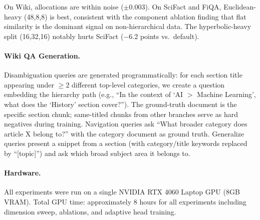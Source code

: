 \documentclass{article}
\begin{document}
On Wiki, allocations are within noise ($\pm$0.003). On SciFact and FiQA, Euclidean-heavy (48,8,8) is best, consistent with the component ablation finding that flat similarity is the dominant signal on non-hierarchical data. The hyperbolic-heavy split (16,32,16) notably hurts SciFact ($-$6.2 points vs.\ default).

\paragraph{Wiki QA Generation.} Disambiguation queries are generated programmatically: for each section title appearing under $\geq$2 different top-level categories, we create a question embedding the hierarchy path (e.g., ``In the context of `AI $>$ Machine Learning', what does the `History' section cover?''). The ground-truth document is the specific section chunk; same-titled chunks from other branches serve as hard negatives during training. Navigation queries ask ``What broader category does article X belong to?'' with the category document as ground truth. Generalize queries present a snippet from a section (with category/title keywords replaced by ``[topic]'') and ask which broad subject area it belongs to.

\paragraph{Hardware.} All experiments were run on a single NVIDIA RTX 4060 Laptop GPU (8GB VRAM). Total GPU time: approximately 8 hours for all experiments including dimension sweep, ablations, and adaptive head training.
\end{document}
